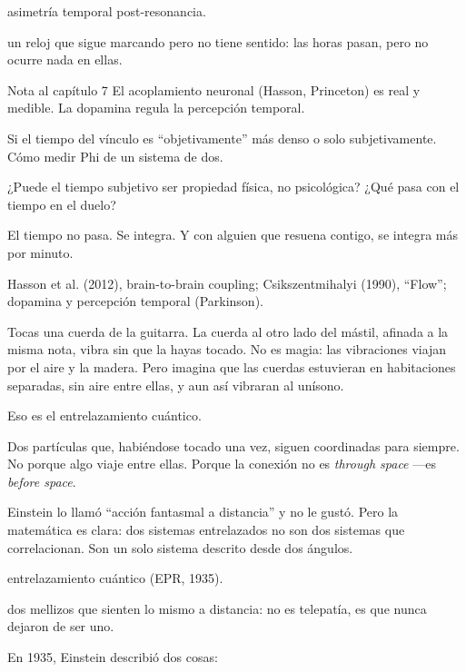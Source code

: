 \begin{fisica}
 asimetría temporal post-resonancia.

 un reloj que sigue marcando pero no tiene sentido: las horas pasan, pero no ocurre nada en ellas.
\end{fisica}
\begin{notacap}{Nota al capítulo 7}
 El acoplamiento neuronal (Hasson, Princeton) es real y medible. La dopamina regula la percepción temporal.

 Si el tiempo del vínculo es “objetivamente” más denso o solo subjetivamente. Cómo medir Phi de un sistema de dos.

 ¿Puede el tiempo subjetivo ser propiedad física, no psicológica? ¿Qué pasa con el tiempo en el duelo?

 El tiempo no pasa. Se integra. Y con alguien que resuena contigo, se integra más por minuto.

 Hasson et al. (2012), brain-to-brain coupling; Csikszentmihalyi (1990), “Flow”; dopamina y percepción temporal (Parkinson).
\end{notacap}
\noindent {}

Tocas una cuerda de la guitarra. La cuerda al otro lado del mástil, afinada a la misma nota, vibra sin que la hayas tocado. No es magia: las vibraciones viajan por el aire y la madera. Pero imagina que las cuerdas estuvieran en habitaciones separadas, sin aire entre ellas, y aun así vibraran al unísono.

Eso es el entrelazamiento cuántico.

Dos partículas que, habiéndose tocado una vez, siguen coordinadas para siempre. No porque algo viaje entre ellas. Porque la conexión no es \emph{through space} —es \emph{before space}.

Einstein lo llamó “acción fantasmal a distancia” y no le gustó. Pero la matemática es clara: dos sistemas entrelazados no son dos sistemas que correlacionan. Son un solo sistema descrito desde dos ángulos.

\begin{fisica}
 entrelazamiento cuántico (EPR, 1935).

 dos mellizos que sienten lo mismo a distancia: no es telepatía, es que nunca dejaron de ser uno.
\end{fisica}
\noindent En 1935, Einstein describió dos cosas:

